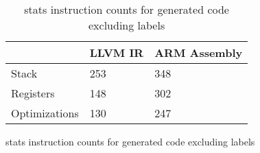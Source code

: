 \begin{table}[h!]
\centering
\begin{tabular}{p{}p{}p{}}
  \hline
 & LLVM IR & ARM Assembly \\ 
  \hline
Stack & 253 & 348 \\ 
  Registers & 148 & 302 \\ 
  Optimizations & 130 & 247 \\ 
   \hline
\end{tabular}
\caption{stats instruction counts for generated code excluding labels}
\caption{stats instruction counts for generated code excluding labels}
\end{table}
